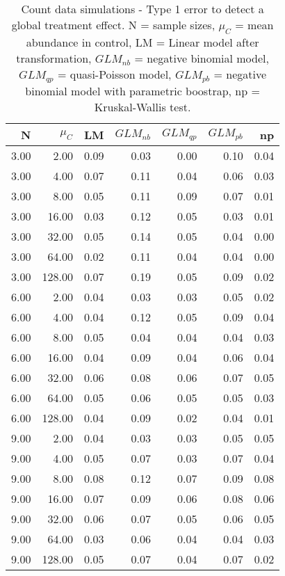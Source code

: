 \begin{table}[H]
\centering
\caption{Count data simulations - Type 1 error to detect a global treatment effect. N = sample sizes, 
             $\mu_C$ = mean abundance in control, LM = Linear model after transformation, 
             $GLM_{nb}$ = negative binomial model, $GLM_{qp}$ = quasi-Poisson model, 
             $GLM_{pb}$ = negative binomial model with parametric boostrap, np = Kruskal-Wallis test.} 
\label{tab:t1_glob_c}
{\footnotesize
\begin{tabular}{rrrrrrr}
  \hline
N & $\mu_C$ & LM & $GLM_{nb}$ & $GLM_{qp}$ & $GLM_{pb}$ & np \\ 
  \hline
3.00 & 2.00 & 0.09 & 0.03 & 0.00 & 0.10 & 0.04 \\ 
  3.00 & 4.00 & 0.07 & 0.11 & 0.04 & 0.06 & 0.03 \\ 
  3.00 & 8.00 & 0.05 & 0.11 & 0.09 & 0.07 & 0.01 \\ 
  3.00 & 16.00 & 0.03 & 0.12 & 0.05 & 0.03 & 0.01 \\ 
  3.00 & 32.00 & 0.05 & 0.14 & 0.05 & 0.04 & 0.00 \\ 
  3.00 & 64.00 & 0.02 & 0.11 & 0.04 & 0.04 & 0.00 \\ 
  3.00 & 128.00 & 0.07 & 0.19 & 0.05 & 0.09 & 0.02 \\ 
  6.00 & 2.00 & 0.04 & 0.03 & 0.03 & 0.05 & 0.02 \\ 
  6.00 & 4.00 & 0.04 & 0.12 & 0.05 & 0.09 & 0.04 \\ 
  6.00 & 8.00 & 0.05 & 0.04 & 0.04 & 0.04 & 0.03 \\ 
  6.00 & 16.00 & 0.04 & 0.09 & 0.04 & 0.06 & 0.04 \\ 
  6.00 & 32.00 & 0.06 & 0.08 & 0.06 & 0.07 & 0.05 \\ 
  6.00 & 64.00 & 0.05 & 0.06 & 0.05 & 0.05 & 0.03 \\ 
  6.00 & 128.00 & 0.04 & 0.09 & 0.02 & 0.04 & 0.01 \\ 
  9.00 & 2.00 & 0.04 & 0.03 & 0.03 & 0.05 & 0.05 \\ 
  9.00 & 4.00 & 0.05 & 0.07 & 0.03 & 0.07 & 0.04 \\ 
  9.00 & 8.00 & 0.08 & 0.12 & 0.07 & 0.09 & 0.08 \\ 
  9.00 & 16.00 & 0.07 & 0.09 & 0.06 & 0.08 & 0.06 \\ 
  9.00 & 32.00 & 0.06 & 0.07 & 0.05 & 0.06 & 0.05 \\ 
  9.00 & 64.00 & 0.03 & 0.06 & 0.04 & 0.04 & 0.03 \\ 
  9.00 & 128.00 & 0.05 & 0.07 & 0.04 & 0.07 & 0.02 \\ 
   \hline
\end{tabular}
}
\end{table}
